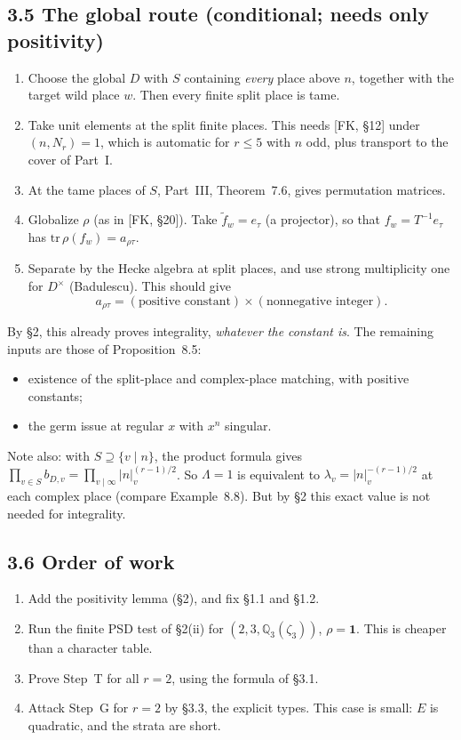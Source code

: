\documentclass[11pt]{article}
\theoremstyle{plain}
\begin{document}
\subsection*{3.5 The global route (conditional; needs only positivity)}
\begin{enumerate}[label=(\arabic*)]
\item Choose the global $D$ with $S$ containing \emph{every} place above
$n$, together with the target wild place $w$. Then every finite split
place is tame.
\item Take unit elements at the split finite places. This needs [FK,
\S12] under $(n,N_r)=1$, which is automatic for $r\le5$ with $n$ odd,
plus transport to the cover of Part~I.
\item At the tame places of $S$, Part~III, Theorem~7.6, gives
permutation matrices.
\item Globalize $\rho$ (as in [FK, \S20]). Take
$\tilde f_w=e_\tau$ (a projector), so that $f_w=T^{-1}e_\tau$ has
$\mathrm{tr}\,\rho(f_w)=a_{\rho\tau}$.
\item Separate by the Hecke algebra at split places, and use strong
multiplicity one for $D^\times$ (Badulescu). This should give
\[
a_{\rho\tau}=(\text{positive constant})\times(\text{nonnegative integer}).
\]
\end{enumerate}
By \S2, this already proves integrality, \emph{whatever the constant is}.
The remaining inputs are those of Proposition~8.5:
\begin{itemize}
\item existence of the split-place and complex-place matching, with
positive constants;
\item the germ issue at regular $x$ with $x^n$ singular.
\end{itemize}
Note also: with $S\supseteq\{v\mid n\}$, the product formula gives
$\prod_{v\in S}b_{D,v}=\prod_{v\mid\infty}|n|_v^{(r-1)/2}$. So
$\Lambda=1$ is equivalent to $\lambda_v=|n|_v^{-(r-1)/2}$ at each
complex place (compare Example~8.8). But by \S2 this exact value is not
needed for integrality.

\subsection*{3.6 Order of work}
\begin{enumerate}[label=(\alph*)]
\item Add the positivity lemma (\S2), and fix \S1.1 and \S1.2.
\item Run the finite PSD test of \S2(ii) for
$(2,3,\mathbb Q_3(\zeta_3))$, $\rho=\mathbf1$. This is cheaper than a
character table.
\item Prove Step~T for all $r=2$, using the formula of \S3.1.
\item Attack Step~G for $r=2$ by \S3.3, the explicit types. This case
is small: $E$ is quadratic, and the strata are short.
\end{enumerate}
\end{document}
